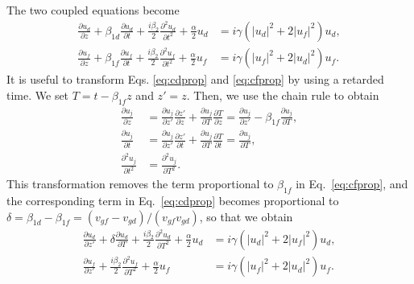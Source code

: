 The two coupled equations become
%
\begin{subequations}
\begin{align}
\frac{\partial u_d}{\partial z} + \beta_{1d}\frac{\partial u_d}{\partial t} + \frac{i\beta_{2}}{2}\frac{\partial^2 u_d}{\partial t^2} + \frac{\alpha}{2}u_d &= i\gamma\left(|u_d|^2 + 2|u_f|^2\right)u_d, \label{eq:cdprop} \\
\frac{\partial u_f}{\partial z} + \beta_{1f}\frac{\partial u_f}{\partial t} + \frac{i\beta_{2}}{2}\frac{\partial^2 u_f}{\partial t^2} + \frac{\alpha}{2}u_f &= i\gamma\left(|u_f|^2 + 2|u_d|^2\right)u_f. \label{eq:cfprop}
\end{align}
\end{subequations}
%
It is useful to transform Eqs. \ref{eq:cdprop} and \ref{eq:cfprop} by using a retarded time. We set $T = t - \beta_{1f}z$ and $z' = z$. Then, we use the chain rule to obtain
%
\begin{subequations}
\begin{align}
\frac{\partial u_j}{\partial z} &= \frac{\partial u_j}{\partial z'}\frac{\partial z'}{\partial z} + \frac{\partial u_j}{\partial T}\frac{\partial T}{\partial z} =  \frac{\partial u_j}{\partial z'} - \beta_{1f}\frac{\partial u_j}{\partial T}, \\
\frac{\partial u_j}{\partial t} &= \frac{\partial u_j}{\partial z'}\frac{\partial z'}{\partial t} + \frac{\partial u_j}{\partial T}\frac{\partial T}{\partial t} =  \frac{\partial u_j}{\partial T}, \\
\frac{\partial^2 u_j}{\partial t^2} &= \frac{\partial^2 u_j}{\partial T^2}.
\end{align}
\end{subequations}
%
This transformation removes the term proportional to $\beta_{1f}$ in Eq.~\ref{eq:cfprop}, and the corresponding term in Eq.~\ref{eq:cdprop} becomes proportional to $\delta = \beta_{1d} - \beta_{1f} = (v_{gf} - v_{gd})/(v_{gf}v_{gd})$, so that we obtain
%
\begin{subequations}
\begin{align}
\frac{\partial u_d}{\partial z'} + \delta\frac{\partial u_d}{\partial T} + \frac{i\beta_{2}}{2}\frac{\partial^2 u_d}{\partial T^2} + \frac{\alpha}{2}u_d &= i\gamma\left(|u_d|^2 + 2|u_f|^2\right)u_d, \label{eq:dataprop} \\
\frac{\partial u_f}{\partial z'} + \frac{i\beta_{2}}{2}\frac{\partial^2 u_f}{\partial T^2} + \frac{\alpha}{2}u_f &= i\gamma\left(|u_f|^2 + 2|u_d|^2\right)u_f. \label{eq:freqprop}
\end{align}
\end{subequations}
%

